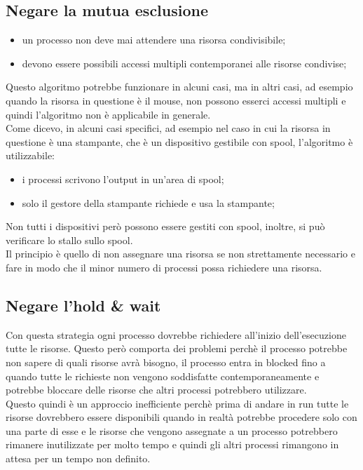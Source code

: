 \documentclass[12pt, letterpaper]{report}
\begin{document}
	\subsection{Negare la mutua esclusione}
	\begin{itemize}
		\item un processo non deve mai attendere una risorsa condivisibile;
		\item devono essere possibili accessi multipli contemporanei alle risorse condivise;
	\end{itemize}
	Questo algoritmo potrebbe funzionare in alcuni casi, ma in altri casi, ad esempio quando la risorsa in questione è il mouse, non possono esserci accessi multipli e quindi l'algoritmo non è applicabile in generale. \\
	Come dicevo, in alcuni casi specifici, ad esempio nel caso in cui la risorsa in questione è una stampante, che è un dispositivo gestibile con spool, l'algoritmo è utilizzabile:
	\begin{itemize}
		\item i processi scrivono l'output in un'area di spool;
		\item solo il gestore della stampante richiede e usa la stampante;
	\end{itemize}
	Non tutti i dispositivi però possono essere gestiti con spool, inoltre, si può verificare lo stallo sullo spool. \\
	Il principio è quello di non assegnare una risorsa se non strettamente necessario e fare in modo che il minor numero di processi possa richiedere una risorsa.
	\subsection{Negare l'hold \& wait}
	Con questa strategia ogni processo dovrebbe richiedere all'inizio dell'esecuzione tutte le risorse. Questo però comporta dei problemi perchè il processo potrebbe non sapere di quali risorse avrà bisogno, il processo entra in blocked fino a quando tutte le richieste non vengono soddisfatte contemporaneamente e potrebbe bloccare delle risorse che altri processi potrebbero utilizzare. \\
	Questo quindi è un approccio inefficiente perchè prima di andare in run tutte le risorse dovrebbero essere disponibili quando in realtà potrebbe procedere solo con una parte di esse e le risorse che vengono assegnate a un processo potrebbero rimanere inutilizzate per molto tempo e quindi gli altri processi rimangono in attesa per un tempo non definito.
\end{document}
